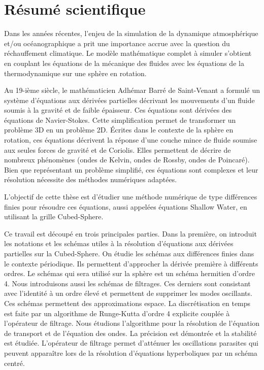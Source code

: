 \documentclass[10pt,a4paper]{article}
\author{Brachet Matthieu}
\begin{document}
\section{Résumé scientifique}

Dans les années récentes, l'enjeu de la simulation de la dynamique atmosphérique et/ou océanographique a prit une importance accrue avec la question du réchauffement climatique.
Le modèle mathématique complet à simuler s'obtient en couplant les équations de la mécanique des fluides avec les équations de la thermodynamique sur une sphère en rotation.

Au 19-ième siècle, le mathématicien Adhémar Barré de Saint-Venant a formulé un système d'équations aux dérivées partielles décrivant les mouvements d'un fluide soumis à la gravité et de faible épaisseur. Ces équations sont dérivées des équations de Navier-Stokes. Cette simplification permet de transformer un problème 3D en un problème 2D. Écrites dans le contexte de la sphère en rotation, ces équations décrivent la réponse d'une couche mince de fluide soumise aux seules forces de gravité et de Coriolis. Elles permettent de décrire de nombreux phénomènes (ondes de Kelvin, ondes de Rossby, ondes de Poincaré). Bien que représentant un problème simplifié, ces équations sont complexes et leur résolution nécessite des méthodes numériques adaptées.

L'objectif de cette thèse est d'étudier une méthode numérique de type différences finies pour résoudre ces équations, aussi appelées équations Shallow Water, en utilisant la grille Cubed-Sphere.

Ce travail est découpé en trois principales parties. Dans la première, on introduit les notations et les schémas utiles à la résolution d'équations aux dérivées partielles sur la Cubed-Sphere. On étudie les schémas aux différences finies dans le contexte périodique. Ils permettent d'approcher la dérivée première à différents ordres. Le schémas qui sera utilisé sur la sphère est un schéma hermitien d'ordre 4. Nous introduisons aussi les schémas de filtrages. Ces derniers sont consistant avec l'identité à un ordre élevé et permettent de supprimer les modes oscillants. Ces schémas permettent des approximations espace. La discrétisation en temps est faite par un algorithme de Runge-Kutta d'ordre 4 explicite couplée à l'opérateur de filtrage. Nous étudions l'algorithme pour la résolution de l'équation de transport et de l'équation des ondes. La précision est démontrée et la stabilité est étudiée. L'opérateur de filtrage permet d'atténuer les oscillations parasites qui peuvent apparaître lors de la résolution d'équations hyperboliques par un schéma centré.
\end{document}

